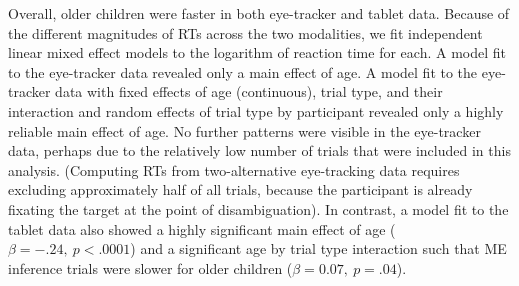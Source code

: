 \documentclass[man,noapacite]{apa2}
\begin{document}
Overall, older children were faster in both eye-tracker and tablet data. Because of the different magnitudes of RTs across the two modalities, we fit independent linear mixed effect models to the logarithm of reaction time for each. A model fit to the eye-tracker data revealed only a main effect of age. A model fit to the eye-tracker data with fixed effects of age (continuous), trial type, and their interaction and random effects of trial type by participant revealed only a highly reliable main effect of age. No further patterns were visible in the eye-tracker data, perhaps due to the relatively low number of trials that were included in this analysis. (Computing RTs from two-alternative eye-tracking data requires excluding approximately half of all trials, because the participant is already fixating the target at the point of disambiguation). In contrast, a model fit to the tablet data also showed a highly significant main effect of age ($\beta=-.24,~p < .0001$) and a significant age by trial type interaction such that ME inference trials were slower for older children ($\beta = 0.07,~p =.04$).
\end{document}
